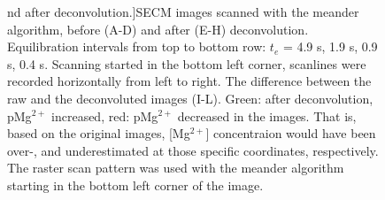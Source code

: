 \begin{figure}[!hp]
nd after deconvolution.]{SECM images scanned with the meander algorithm, before (A-D) and after (E-H) deconvolution.
Equilibration intervals from top to bottom row: $t_e$ = 4.9 s, 1.9 s, 0.9 s, 0.4 s.
Scanning started in the bottom left corner, scanlines were recorded horizontally from left to right.
The difference between the raw and the deconvoluted images (I-L).
Green: after deconvolution, pMg$^{2+}$ increased, red: pMg$^{2+}$ decreased in the images.
That is, based on the original images, [Mg$^{2+}$] concentraion would have been over-, and underestimated at those specific coordinates, respectively.
The raster scan pattern was used with the meander algorithm starting in the bottom left corner of the image.}
\label{fig:deconvoluted_meander}
\end{figure}

\begin{figure}[!hp]
\centering

\end{figure}
